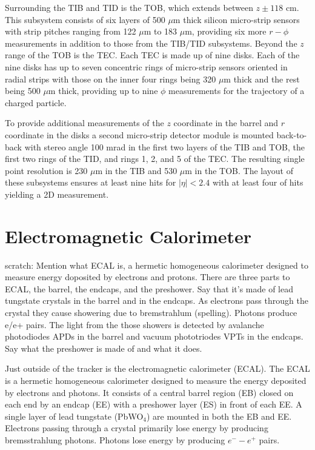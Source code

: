 Surrounding the TIB and TID is the TOB, which extends between $z \pm 118$ cm.  This subsystem consists of six layers of 500 $\mu$m thick silicon micro-strip sensors with strip pitches ranging from 122 $\mu$m to 183 $\mu$m, providing six more $r-\phi$ measurements in addition to those from the TIB/TID subsystems. Beyond the $z$ range of the TOB is the TEC.  Each TEC is made up of nine disks.  Each of the nine disks has up to seven concentric rings of micro-strip sensors oriented in radial strips with those on the inner four rings being 320 $\mu$m thick and the rest being 500 $\mu$m thick, providing up to nine $\phi$ measurements for the trajectory of a charged particle.  

To provide additional measurements of the $z$ coordinate in the barrel and $r$ coordinate in the disks a second micro-strip detector module is mounted back-to-back with stereo angle 100 mrad in the first two layers of the TIB and TOB, the first two rings of the TID, and rings 1, 2, and 5 of the TEC.  The resulting single point resolution is 230 $\mu$m in the TIB and 530 $\mu$m in the TOB.  The layout of these subsystems ensures at least nine hits for $|\eta| < 2.4$ with at least four of hits yielding a 2D measurement.



\section{Electromagnetic Calorimeter}

scratch:
Mention what ECAL is, a hermetic homogeneous calorimeter designed to measure energy doposited by electrons and protons.  There are three parts to ECAL, the barrel, the endcaps, and the preshower.  Say that it's made of lead tungstate crystals in the barrel and in the endcaps.  As electrons pass through the crystal they cause showering due to bremstrahlum (spelling).  Photons produce e/e+ pairs.  The light from the those showers is detected by avalanche photodiodes APDs in the barrel and vacuum phototriodes VPTs in the endcaps.  Say what the preshower is made of and what it does.

Just outside of the tracker is the electromagnetic calorimeter (ECAL).  The ECAL is a hermetic homogeneous calorimeter designed to measure the energy deposited by electrons and photons.  It consists of a central barrel region (EB) closed on each end by an endcap (EE) with a preshower layer (ES) in front of each EE.  A single layer of lead tungstate (PbWO$_{4}$) are mounted in both the EB and EE.  Electrons passing through a crystal primarily lose energy by producing bremsstrahlung photons.  Photons lose energy by producing $e^{-}-e^{+}$ pairs.  
  


